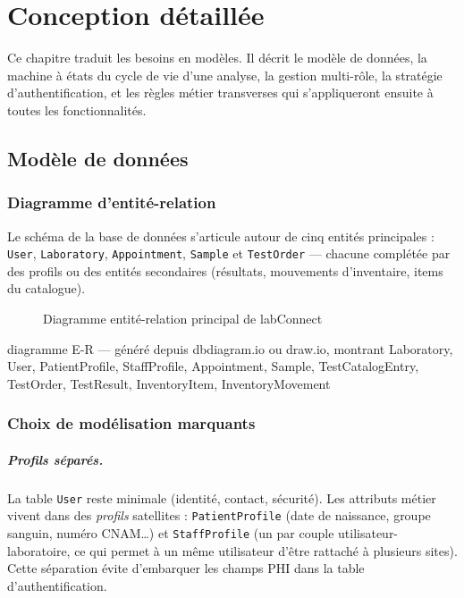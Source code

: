 \documentclass[12pt, a4paper, oneside]{report}
\newcommand{\placeholderFigure}[3][0.75]{%
  \begin{figure}[ht]
    \centering
    \fbox{\begin{minipage}[c][6.5cm][c]{#1\linewidth}
      \centering
      \textit{\small À insérer : #3}
    \end{minipage}}
    \caption{#2}
    \label{fig:#3}
  \end{figure}%
}
\begin{document}
\chapter{Conception détaillée}\label{ch:conception}

\noindent
Ce chapitre traduit les besoins en modèles. Il décrit le modèle de
données, la machine à états du cycle de vie d'une analyse, la gestion
multi-rôle, la stratégie d'authentification, et les règles métier
transverses qui s'appliqueront ensuite à toutes les fonctionnalités.

\section{Modèle de données}

\subsection{Diagramme d'entité-relation}
Le schéma de la base de données s'articule autour de cinq entités
principales : \texttt{User}, \texttt{Laboratory}, \texttt{Appointment},
\texttt{Sample} et \texttt{TestOrder} — chacune complétée par des
profils ou des entités secondaires (résultats, mouvements
d'inventaire, items du catalogue).

\placeholderFigure[0.95]{Diagramme entité-relation principal de labConnect}%
{er-diagram}{diagramme E-R — généré depuis dbdiagram.io ou draw.io,
montrant Laboratory, User, PatientProfile, StaffProfile, Appointment,
Sample, TestCatalogEntry, TestOrder, TestResult, InventoryItem,
InventoryMovement}

\subsection{Choix de modélisation marquants}

\paragraph{Profils séparés.} La table \texttt{User} reste minimale
(identité, contact, sécurité). Les attributs métier vivent dans des
\emph{profils} satellites : \texttt{PatientProfile} (date de naissance,
groupe sanguin, numéro CNAM\ldots) et \texttt{StaffProfile} (un par
couple utilisateur-laboratoire, ce qui permet à un même utilisateur
d'être rattaché à plusieurs sites). Cette séparation évite d'embarquer
les champs PHI dans la table d'authentification.
\end{document}
